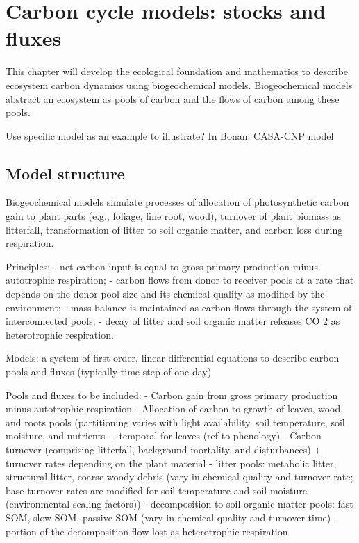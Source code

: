 \documentclass[
  oneside]{book}
\begin{document}
\hypertarget{carbon-cycle-models-stocks-and-fluxes}{%
\section{Carbon cycle models: stocks and fluxes}\label{carbon-cycle-models-stocks-and-fluxes}}

This chapter will develop the ecological foundation and mathematics to describe ecosystem carbon dynamics using biogeochemical models.
Biogeochemical models abstract an ecosystem as pools of carbon and the flows of carbon among these pools.

Use specific model as an example to illustrate? In Bonan: CASA-CNP model

\hypertarget{model-structure}{%
\subsection{Model structure}\label{model-structure}}

Biogeochemical models simulate processes of allocation of photosynthetic carbon gain to plant parts (e.g., foliage, fine root, wood), turnover of plant biomass as litterfall, transformation of litter to soil organic matter, and carbon loss during respiration.

Principles:
- net carbon input is equal to gross primary production minus autotrophic respiration;
- carbon flows from donor to receiver pools at a rate that depends on the donor pool size and its chemical quality as modified by the environment;
- mass balance is maintained as carbon flows through the system of interconnected pools;
- decay of litter and soil organic matter releases CO 2 as heterotrophic respiration.

Models:
a system of first-order, linear differential equations to describe carbon pools and fluxes (typically time step of one day)

Pools and fluxes to be included:
- Carbon gain from gross primary production minus autotrophic respiration
- Allocation of carbon to growth of leaves, wood, and roots pools (partitioning varies with light availability, soil temperature, soil moisture, and nutrients + temporal for leaves (ref to phenology)
- Carbon turnover (comprising litterfall, background mortality, and disturbances) + turnover rates depending on the plant material
- litter pools: metabolic litter, structural litter, coarse woody debris (vary in chemical quality and turnover rate; base turnover rates are modified for soil temperature and soil moisture (environmental scaling factors))
- decomposition to soil organic matter pools: fast SOM, slow SOM, passive SOM (vary in chemical quality and turnover time)
- portion of the decomposition flow lost as heterotrophic respiration
\end{document}
